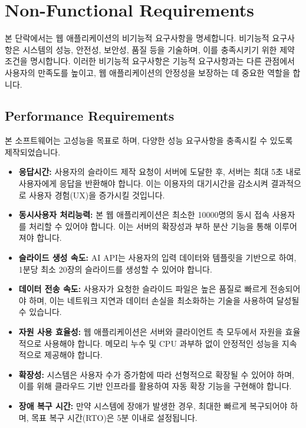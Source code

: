 \documentclass[a4paper, 12pt]{article}
\begin{document}
\section{Non-Functional Requirements}

본 단락에서는 웹 애플리케이션의 비기능적 요구사항을 명세합니다. 비기능적 요구사항은 시스템의 성능, 안전성, 보안성, 품질 등을 기술하며, 이를 충족시키기 위한 제약 조건을 명시합니다. 이러한 비기능적 요구사항은 기능적 요구사항과는 다른 관점에서 사용자의 만족도를 높이고, 웹 애플리케이션의 안정성을 보장하는 데 중요한 역할을 합니다.

\subsection{Performance Requirements}

본 소프트웨어는 고성능을 목표로 하며, 다양한 성능 요구사항을 충족시킬 수 있도록 제작되었습니다.

\begin{itemize}
    \item \textbf{응답시간:} 사용자의 슬라이드 제작 요청이 서버에 도달한 후, 서버는 최대 5초 내로 사용자에게 응답을 반환해야 합니다. 이는 이용자의 대기시간을 감소시켜 결과적으로 사용자 경험(UX)을 증가시킬 것입니다.
    
    \item \textbf{동시사용자 처리능력:} 본 웹 애플리케이션은 최소한 10000명의 동시 접속 사용자를 처리할 수 있어야 합니다. 이는 서버의 확장성과 부하 분산 기능을 통해 이루어져야 합니다.
    
    \item \textbf{슬라이드 생성 속도:} AI API는 사용자의 입력 데이터와 템플릿을 기반으로 하여, 1분당 최소 20장의 슬라이드를 생성할 수 있어야 합니다.
    
    \item \textbf{데이터 전송 속도:} 사용자가 요청한 슬라이드 파일은 높은 품질로 빠르게 전송되어야 하며, 이는 네트워크 지연과 데이터 손실을 최소화하는 기술을 사용하여 달성될 수 있습니다.
    
    \item \textbf{자원 사용 효율성:} 웹 애플리케이션은 서버와 클라이언트 측 모두에서 자원을 효율적으로 사용해야 합니다. 메모리 누수 및 CPU 과부하 없이 안정적인 성능을 지속적으로 제공해야 합니다.
    
    \item \textbf{확장성:} 시스템은 사용자 수가 증가함에 따라 선형적으로 확장될 수 있어야 하며, 이를 위해 클라우드 기반 인프라를 활용하여 자동 확장 기능을 구현해야 합니다.
    
    \item \textbf{장애 복구 시간:} 만약 시스템에 장애가 발생한 경우, 최대한 빠르게 복구되어야 하며, 목표 복구 시간(RTO)은 5분 이내로 설정됩니다.
\end{itemize}
\end{document}
